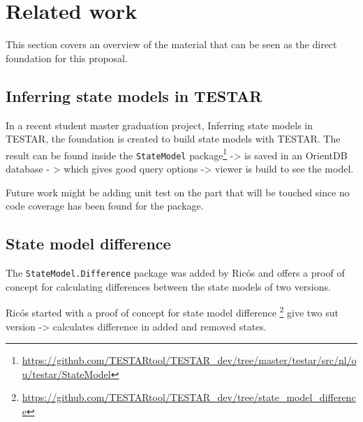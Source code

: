 \section{Related work} \label{releatedWork}
    
    This section covers an overview of the material that can be seen as the direct foundation for this proposal.
    
    
    
    \subsection{Inferring state models in TESTAR}
    
        In a recent student master graduation project, Inferring state models in TESTAR, \cite{thesisMulders}  the foundation is created to build state models with TESTAR. The result can be found inside the \verb|StateModel| package\footnote{\url{https://github.com/TESTARtool/TESTAR_dev/tree/master/testar/src/nl/ou/testar/StateModel}}
        -> is saved in an OrientDB database - > which gives good query options -> viewer is build to see the model. 
        
        Future work might be adding unit test on the part that will be touched since no code coverage has been found for the package.

        
        
        


    \subsection{State model difference}
        The \verb|StateModel.Difference| package was added by Ricós\cite{stateDiff} and offers a proof of concept for calculating differences between the state models of two versions. 
        
        Ricós started with a proof of concept for state model difference \footnote{\url{https://github.com/TESTARtool/TESTAR_dev/tree/state_model_difference}}
        give two sut version -> calculates difference in added and removed states.
        
